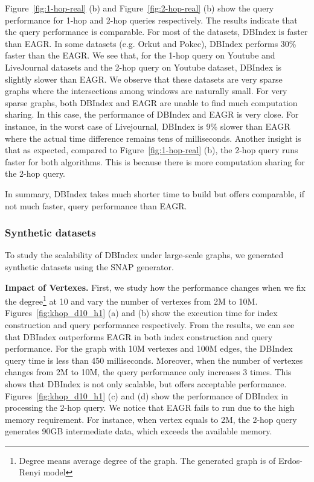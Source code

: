Figure~\ref{fig:1-hop-real} (b) and Figure~\ref{fig:2-hop-real} (b) 
show the query performance for 1-hop and 2-hop queries respectively. 
The results indicate that the query performance is comparable. 
For most of the datasets, DBIndex is faster than EAGR.
In some datasets (e.g. Orkut and Pokec), DBIndex performs 30\% faster than the EAGR. 
We see that, for the 1-hop query on 
Youtube and LiveJournal datasets and the 2-hop query 
on Youtube dataset, DBIndex is slightly slower than EAGR. We observe 
that these datasets are very sparse graphs where the intersections among windows are naturally small. For very sparse graphs, 
both DBIndex and EAGR are unable to find much computation sharing. In this case, the performance of DBIndex and EAGR is very close. For instance, in the worst case of Livejournal, DBIndex is 9\% slower than EAGR where the actual time difference remains tens of milliseconds.    
%
Another insight is that as expected, compared to Figure~\ref{fig:1-hop-real} (b), 
the 2-hop query runs faster for both algorithms. This is because there is more computation sharing for the 2-hop query. 

In summary, 
DBIndex takes much shorter time to build but offers comparable, if not much faster, query 
performance than EAGR.


\subsubsection{Synthetic datasets}
To study the scalability of DBIndex under large-scale graphs, 
we generated synthetic datasets using the SNAP generator. 


\textbf{Impact of Vertexes.} First, we study how the performance 
changes when we fix the degree\footnote{Degree means average degree of the graph. The generated graph is of Erdos-Renyi model } at 10 and vary the number of vertexes from 
2M to 10M. Figures~\ref{fig:khop_d10_h1} (a) and (b) show the execution time for index construction and query performance respectively. 
From the results, we can see that DBIndex outperforms EAGR in
both index construction and query performance. For the graph with 10M vertexes and 100M edges, the DBIndex query time is less than 450 milliseconds. 
Moreover, when the number of vertexes changes from 2M to 10M, 
the query performance only increases 3 times. This shows that
DBIndex is not only scalable, but offers acceptable performance. Figures~\ref{fig:khop_d10_h1} (c) and (d) show the
performance of DBIndex in processing the 2-hop query. We notice that EAGR fails to run due to the high memory requirement. For instance, when vertex equals to 2M, the 2-hop query generates 90GB intermediate data, which exceeds the available memory.

